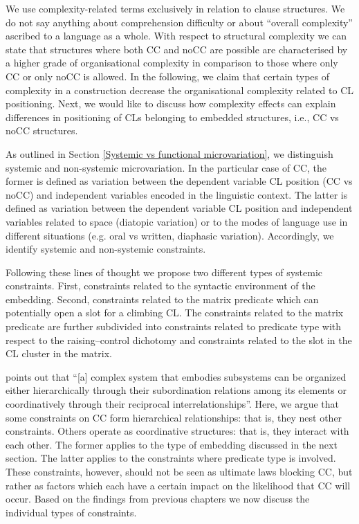 We use complexity-related terms exclusively in relation to clause structures. We do not say anything about comprehension difficulty or about “overall complexity” ascribed to a language as a whole. With respect to structural complexity we can state that structures where both CC and noCC are possible are characterised by a higher grade of organisational complexity in comparison to those where only CC or only noCC is allowed. In the following, we claim that certain types of complexity in a construction decrease the organisational complexity related to CL positioning. Next, we would like to discuss how complexity effects can explain differences in positioning of CLs belonging to embedded structures, i.e., CC vs noCC structures.

As outlined in Section \ref{Systemic vs functional microvariation}, we distinguish systemic and non-systemic microvariation. In the particular case of CC, the former is defined as variation between the dependent variable CL position (CC vs noCC) and independent variables encoded in the linguistic context. The latter is defined as variation between the dependent variable CL position and independent variables related to space (diatopic variation) or to the modes of language use in different situations (e.g. oral vs written, diaphasic variation). Accordingly, we identify systemic and non-systemic constraints. 

Following these lines of thought we propose two different types of systemic constraints. First, constraints related to the syntactic environment of the embedding. Second, constraints related to the matrix predicate which can potentially open a slot for a climbing CL. The constraints related to the matrix predicate are further subdivided into constraints related to predicate type with respect to the raising--control dichotomy and constraints related to the slot in the CL cluster in the matrix. 

\citet[][11]{Rescher98} points out that “[a] complex system that embodies subsystems can be organized either hierarchically through their subordination relations among its elements or coordinatively through their reciprocal interrelationships”. Here, we argue that some constraints on CC form hierarchical relationships: that is, they nest other constraints. Others operate as coordinative structures: that is, they interact with each other. The former applies to the type of embedding discussed in the next section. The latter applies to the constraints where predicate type is involved. These constraints, however, should not be seen as ultimate laws blocking CC, but rather as factors which each have a certain impact on the likelihood that CC will occur. Based on the findings from previous chapters we now discuss the individual types of constraints.

